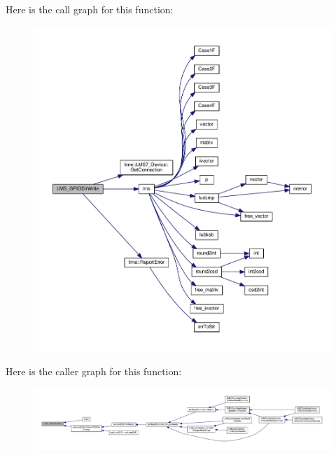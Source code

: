 Here is the call graph for this function\+:
\nopagebreak
\begin{figure}[H]
\begin{center}
\leavevmode
\includegraphics[width=350pt]{df/de1/lms7__api_8cpp_acf47e711bafa0e173d0471b2091b98ee_cgraph}
\end{center}
\end{figure}




Here is the caller graph for this function\+:
\nopagebreak
\begin{figure}[H]
\begin{center}
\leavevmode
\includegraphics[width=350pt]{df/de1/lms7__api_8cpp_acf47e711bafa0e173d0471b2091b98ee_icgraph}
\end{center}
\end{figure}


